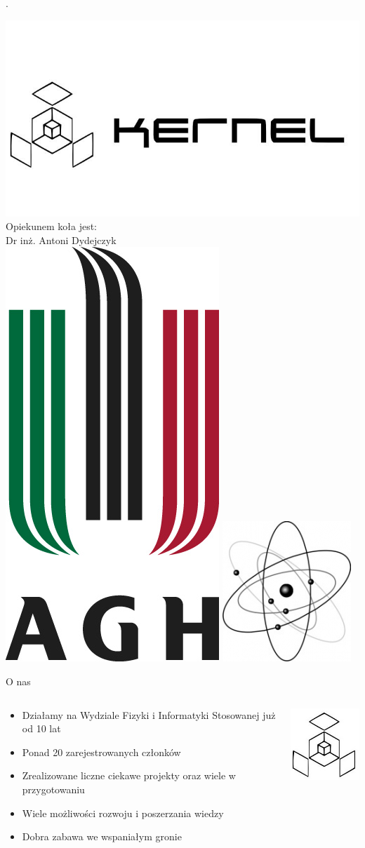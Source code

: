 \documentclass{beamer}
\date{}
\title{}
\begin{document}
\begin{frame}{.}
	\begin{center}
	\includegraphics[width=0.5\linewidth]{kernel.jpg}\\
	Opiekunem koła jest:\\
	Dr inż. Antoni Dydejczyk\\
	\includegraphics[width=0.1\linewidth]{agh.jpg}
	\hspace{20em}
	\includegraphics[width=0.1\linewidth]{fis.jpg}
	\end{center}
\end{frame}
\begin{frame}{O nas}
	\begin{minipage}[0.2\textheight]{\textwidth}
	\begin{columns}[T]
	\begin{column}{0.6\textwidth}
	\begin{itemize}
	\item Działamy na Wydziale Fizyki i Informatyki Stosowanej już od 10 lat
	\item Ponad 20 zarejestrowanych członków
	\item Zrealizowane liczne ciekawe projekty oraz wiele w przygotowaniu
	\item Wiele możliwości rozwoju i poszerzania wiedzy
	\item Dobra zabawa we wspaniałym gronie
	\end{itemize}
	\end{column}
	\begin{column}{0.2\textwidth}
	\includegraphics[width=3cm]{kernel_mini.jpg}
	\end{column}
	\end{columns}
	\end{minipage}
\end{frame}
\end{document}
